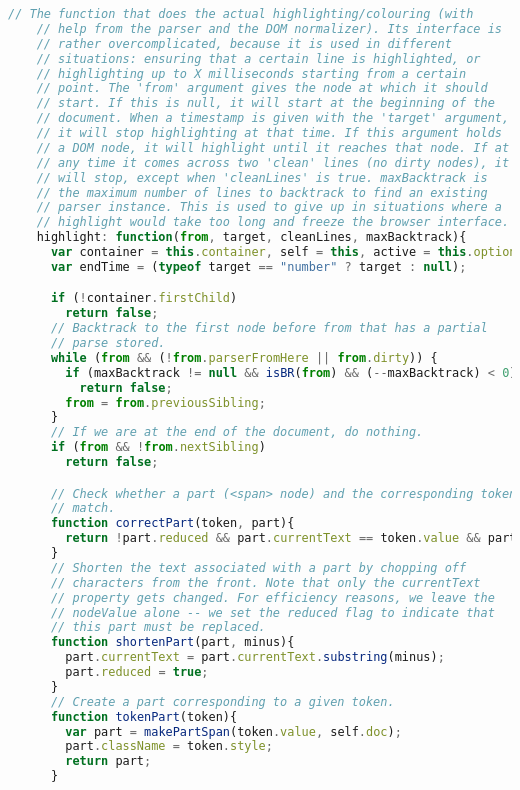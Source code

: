 \begin{lstlisting}[language=Javascript]
    // The function that does the actual highlighting/colouring (with
    // help from the parser and the DOM normalizer). Its interface is
    // rather overcomplicated, because it is used in different
    // situations: ensuring that a certain line is highlighted, or
    // highlighting up to X milliseconds starting from a certain
    // point. The 'from' argument gives the node at which it should
    // start. If this is null, it will start at the beginning of the
    // document. When a timestamp is given with the 'target' argument,
    // it will stop highlighting at that time. If this argument holds
    // a DOM node, it will highlight until it reaches that node. If at
    // any time it comes across two 'clean' lines (no dirty nodes), it
    // will stop, except when 'cleanLines' is true. maxBacktrack is
    // the maximum number of lines to backtrack to find an existing
    // parser instance. This is used to give up in situations where a
    // highlight would take too long and freeze the browser interface.
    highlight: function(from, target, cleanLines, maxBacktrack){
      var container = this.container, self = this, active = this.options.activeTokens;
      var endTime = (typeof target == "number" ? target : null);

      if (!container.firstChild)
        return false;
      // Backtrack to the first node before from that has a partial
      // parse stored.
      while (from && (!from.parserFromHere || from.dirty)) {
        if (maxBacktrack != null && isBR(from) && (--maxBacktrack) < 0)
          return false;
        from = from.previousSibling;
      }
      // If we are at the end of the document, do nothing.
      if (from && !from.nextSibling)
        return false;

      // Check whether a part (<span> node) and the corresponding token
      // match.
      function correctPart(token, part){
        return !part.reduced && part.currentText == token.value && part.className == token.style;
      }
      // Shorten the text associated with a part by chopping off
      // characters from the front. Note that only the currentText
      // property gets changed. For efficiency reasons, we leave the
      // nodeValue alone -- we set the reduced flag to indicate that
      // this part must be replaced.
      function shortenPart(part, minus){
        part.currentText = part.currentText.substring(minus);
        part.reduced = true;
      }
      // Create a part corresponding to a given token.
      function tokenPart(token){
        var part = makePartSpan(token.value, self.doc);     
        part.className = token.style;
        return part;
      }


\end{lstlisting}
